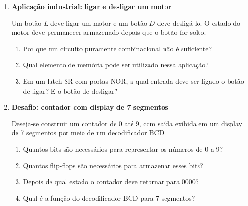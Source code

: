 \documentclass[a4paper,12pt]{article}
\begin{document}
\begin{enumerate}[leftmargin=0.8cm,label=\textbf{\arabic*.},itemsep=0.65cm]
\begin{enumerate}[label=\alph*)]
    \item Quantos flip-flops são necessários para representar os valores de
    0 até 7? Justifique.
    \item Qual dispositivo deve receber os pulsos do sensor?
    \item Qual será o valor binário mostrado depois da passagem de cinco peças?
\end{enumerate}

\vspace{1.3cm}

\item \textbf{Aplicação industrial: ligar e desligar um motor}

Um botão $L$ deve ligar um motor e um botão $D$ deve desligá-lo. O estado do
motor deve permanecer armazenado depois que o botão for solto.

\begin{enumerate}[label=\alph*)]
    \item Por que um circuito puramente combinacional não é suficiente?
    \item Qual elemento de memória pode ser utilizado nessa aplicação?
    \item Em um latch SR com portas NOR, a qual entrada deve ser ligado o botão
    de ligar? E o botão de desligar?
\end{enumerate}

\vspace{1.3cm}

\item \textbf{Desafio: contador com display de 7 segmentos}

Deseja-se construir um contador de 0 até 9, com saída exibida em um display de
7 segmentos por meio de um decodificador BCD.

\begin{enumerate}[label=\alph*)]
    \item Quantos bits são necessários para representar os números de 0 a 9?
    \item Quantos flip-flops são necessários para armazenar esses bits?
    \item Depois de qual estado o contador deve retornar para $0000$?
    \item Qual é a função do decodificador BCD para 7 segmentos?
\end{enumerate}

\vspace{1.5cm}

\end{enumerate}

\begin{center}
\end{center}
\end{document}
